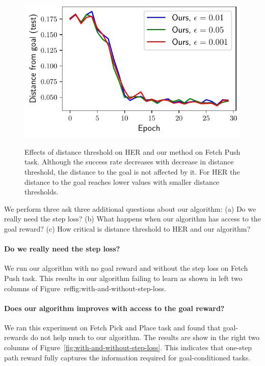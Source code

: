 \begin{figure}
  \includegraphics[width=\frac\columnwidth]{media/res/ablate-ddpg-dqst-low_tresh_chosen-low_thresh_alt-dqst/0.001-FetchPushPR-be467dfepoch-test/ag_g_dist.pdf}%
  \label{fig:with-different-distance-thresholds}%
  \caption{Effects of distance threshold on HER and our method on Fetch Push
task. Although the success rate decreases with decrease in distance threshold,
the distance to the goal is not affected by it. For HER the distance to the goal
reaches lower values with smaller distance thresholds.}%
\end{figure}%
% 

We perform three ask three additional questions about our algorithm:
(a) Do we really need the step loss?
(b) What happens when our algorithm has access to the goal reward?
(c) How critical is distance threshold to HER and our algorithm?
\paragraph{Do we really need the step loss?}
%
We run our algorithm with no goal reward and without the step loss on Fetch Push
task. This results in our algorithm failing to learn as shown in left two
columns of Figure~ref{fig:with-and-without-step-loss}.

\paragraph{Does our algorithm improves with access to the goal reward?}

We ran this experiment on Fetch Pick and Place task and found that goal-rewards
do not help much to our algorithm. The results are show in the right two columns
of Figure~\ref{fig:with-and-without-step-loss}. This indicates that one-step path reward
fully captures the information required for goal-conditioned tasks.

